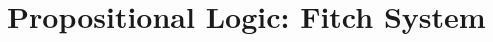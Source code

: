 \documentclass[a4paper, 11pt]{article} %
\begin{document}




\section*{\sc Propositional Logic: Fitch System}

\end{document}

